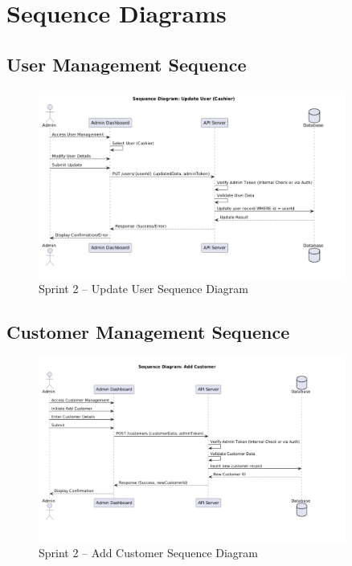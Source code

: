 \section{Sequence Diagrams}

\subsection{User Management Sequence}

\begin{figure}[H]
  \centering
  \includegraphics[width=0.9\textwidth]{figures/images/sprint2sequence diagram(update user).png}
  \caption{Sprint 2 – Update User Sequence Diagram}
  \label{fig:sprint2-update-user}
\end{figure}

\subsection{Customer Management Sequence}

\begin{figure}[H]
  \centering
  \includegraphics[width=0.9\textwidth]{figures/images/sprint2sequence(add customer).png}
  \caption{Sprint 2 – Add Customer Sequence Diagram}
  \label{fig:sprint2-add-customer}
\end{figure}

